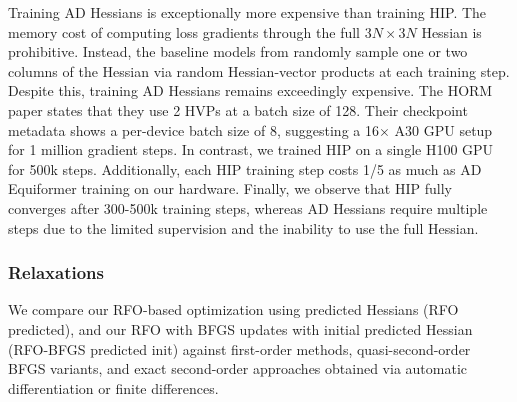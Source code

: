 \documentclass[pdflatex,sn-mathphys-num]{sn-jnl}%
\theoremstyle{thmstyleone}%
\theoremstyle{thmstyletwo}%
\theoremstyle{thmstylethree}%
\begin{document}
\begin{appendices}
Training AD Hessians is exceptionally more expensive than training HIP.
The memory cost of computing loss gradients through the full  $3N\times3N$ Hessian is prohibitive. Instead, the baseline models from \cite{cui2025horm} randomly sample one or two columns of the Hessian via random Hessian-vector products at each training step. Despite this, training AD Hessians remains exceedingly expensive. The HORM paper states that they use 2 HVPs at a batch size of 128. Their checkpoint metadata shows a per-device batch size of 8, suggesting a 16$\times$ A30 GPU setup for 1 million gradient steps.
In contrast, we trained HIP on a single H100 GPU for 500k steps. Additionally, each HIP training step costs 1/5 as much as AD Equiformer training on our hardware. Finally, we observe that HIP fully converges after 300-500k training steps, whereas AD Hessians require multiple steps due to the limited supervision and the inability to use the full Hessian.

\begin{table}[h]
\centering
\renewcommand{\arraystretch}{1.6} %
\caption{\textbf{Summary of training resources.} Comparing HIP to checkpoints from HORM \citep{cui2025horm}.}
\label{tab:traingpu}
\end{table}

\subsubsection{Relaxations \label{sec:relax_methods}}
We compare our RFO-based optimization \citep{RSRFO1998a} using predicted Hessians (RFO predicted), and our RFO with BFGS updates with initial predicted Hessian (RFO-BFGS predicted init) against first-order methods, quasi-second-order BFGS variants, and exact second-order approaches obtained via automatic differentiation or finite differences. 


\end{appendices}
\end{document}
